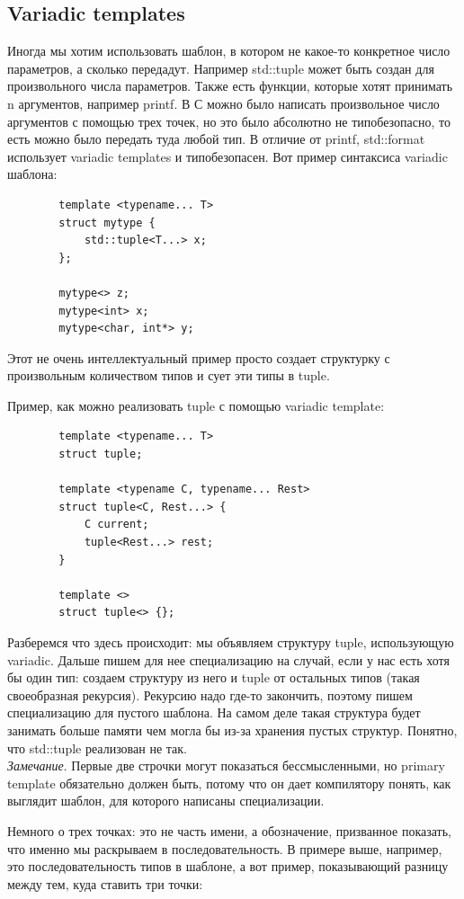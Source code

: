 \documentclass[12pt, a4paper]{article}
\begin{document}
	\subsection{Variadic templates}
	Иногда мы хотим использовать шаблон, в котором не какое-то конкретное число параметров, а сколько передадут. Например std::tuple может быть создан для произвольного числа параметров. Также есть функции, которые хотят принимать n аргументов, например printf. В С можно было написать произвольное число аргументов с помощью трех точек, но это было абсолютно не типобезопасно, то есть можно было передать туда любой тип. В отличие от printf, std::format использует variadic templates и типобезопасен. Вот пример синтаксиса variadic шаблона:
	\begin{verbatim}
		template <typename... T>
		struct mytype {
			std::tuple<T...> x;
		};
		
		mytype<> z;
		mytype<int> x;
		mytype<char, int*> y;
	\end{verbatim}
	Этот не очень интеллектуальный пример просто создает структурку с произвольным количеством типов и сует эти типы в tuple.\\
	\par Пример, как можно реализовать tuple с помощью variadic template:
	\begin{verbatim}
		template <typename... T>
		struct tuple;
		
		template <typename C, typename... Rest>
		struct tuple<C, Rest...> {
			C current;
			tuple<Rest...> rest;
		}
		
		template <>
		struct tuple<> {};
	\end{verbatim}
	Разберемся что здесь происходит: мы объявляем структуру tuple, использующую variadic. Дальше пишем для нее специализацию на случай, если у нас есть хотя бы один тип: создаем структуру из него и tuple от остальных типов (такая своеобразная рекурсия). Рекурсию надо где-то закончить, поэтому пишем специализацию для пустого шаблона. На самом деле такая структура будет занимать больше памяти чем могла бы из-за хранения пустых структур. Понятно, что std::tuple реализован не так.\\
	\textit{Замечание}. Первые две строчки могут показаться бессмысленными, но primary template обязательно должен быть, потому что он дает компилятору понять, как выглядит шаблон, для которого написаны специализации.
	\\\par Немного о трех точках: это не часть имени, а обозначение, призванное показать, что именно мы раскрываем в последовательность. В примере выше, например, это последовательность типов в шаблоне, а вот пример, показывающий разницу между тем, куда ставить три точки:
\end{document}
